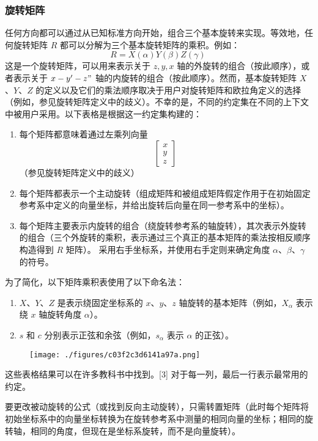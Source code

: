 \subsubsection{旋转矩阵}  
任何方向都可以通过从已知标准方向开始，组合三个基本旋转来实现。等效地，任何旋转矩阵 \( R \) 都可以分解为三个基本旋转矩阵的乘积。例如：
\[
R = X(\alpha) Y(\beta) Z(\gamma)~
\]
这是一个旋转矩阵，可以用来表示关于 $z,y,x$ 轴的外旋转的组合（按此顺序），或者表示关于 $x-y'-z"$ 轴的内旋转的组合（按此顺序）。然而，基本旋转矩阵 \( X \)、\( Y \)、\( Z \) 的定义以及它们的乘法顺序取决于用户对旋转矩阵和欧拉角定义的选择（例如，参见旋转矩阵定义中的歧义）。不幸的是，不同的约定集在不同的上下文中被用户采用。以下表格是根据这一约定集构建的：
\begin{enumerate}
\item 每个矩阵都意味着通过左乘列向量  
\[
\begin{bmatrix} x \\ y \\ z \end{bmatrix}~
\]  
（参见旋转矩阵定义中的歧义）
\item 每个矩阵都表示一个主动旋转（组成矩阵和被组成矩阵假定作用于在初始固定参考系中定义的向量坐标，并给出旋转后向量在同一参考系中的坐标）。
\item 每个矩阵主要表示内旋转的组合（绕旋转参考系的轴旋转），其次表示外旋转的组合（三个外旋转的乘积，表示通过三个真正的基本矩阵的乘法按相反顺序构造得到 \( R \) 矩阵）。
采用右手坐标系，并使用右手定则来确定角度 \( \alpha \)、\( \beta \)、\( \gamma \) 的符号。
\end{enumerate}
为了简化，以下矩阵乘积表使用了以下命名法：
\begin{enumerate}
\item \( X \)、\( Y \)、\( Z \) 是表示绕固定坐标系的 \( x \)、\( y \)、\( z \) 轴旋转的基本矩阵（例如，\( X_\alpha \) 表示绕 \( x \) 轴旋转角度 \( \alpha \)）。
\item \( s \) 和 \( c \) 分别表示正弦和余弦（例如，\( s_\alpha \) 表示 \( \alpha \) 的正弦）。
\end{enumerate}

\begin{figure}[ht]
\centering
\texttt{[image: ./figures/c03f2c3d6141a97a.png]}
\caption{} \label{fig_OLJ_11}
\end{figure}

这些表格结果可以在许多教科书中找到。[3] 对于每一列，最后一行表示最常用的约定。

要更改被动旋转的公式（或找到反向主动旋转），只需转置矩阵（此时每个矩阵将初始坐标系中的向量坐标转换为在旋转参考系中测量的相同向量的坐标；相同的旋转轴，相同的角度，但现在是坐标系旋转，而不是向量旋转）。

